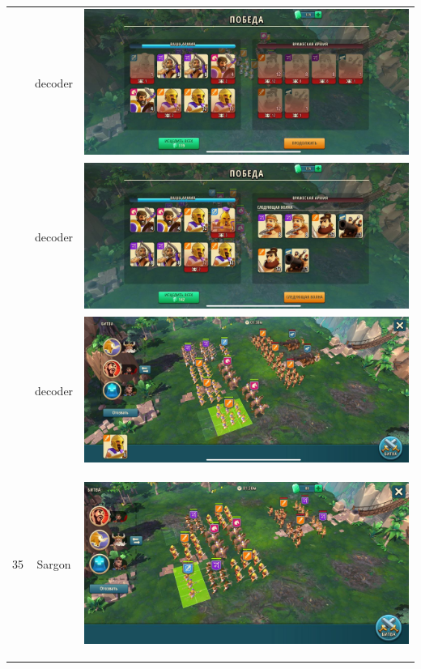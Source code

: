 \begin{longtable}{|c|c|c|}
	& decoder &
	\includegraphics[width=0.75\linewidth]{./parts/media/TreasureHunt/34/decoder/photo_2022-04-07_10-02-50.jpg} \\
	& decoder &
	\includegraphics[width=0.75\linewidth]{./parts/media/TreasureHunt/34/decoder/photo_2022-04-07_10-02-43.jpg} \\
	& decoder &
	\includegraphics[width=0.75\linewidth]{./parts/media/TreasureHunt/34/decoder/photo_2022-04-07_10-02-34.jpg} \\
	\hline
	\multirow{12}{*}{35} & Sargon &
	\hypertarget{fight35}{\includegraphics[width=0.75\linewidth]{./parts/media/TreasureHunt/35/sargon/photo_2022-04-07_10-08-45.jpg}} \\

\end{longtable}
